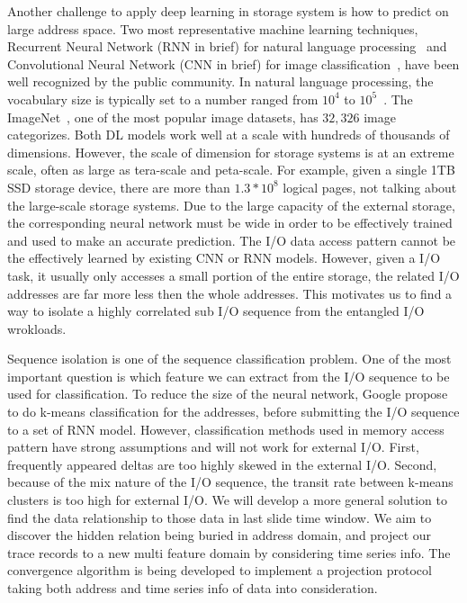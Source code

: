 Another challenge to apply deep learning in storage system is how to predict on large address space.
Two most representative machine learning techniques,
Recurrent Neural Network (RNN in brief) for natural language processing~\cite{graves2013generating,cho2014learning,li2015constructing}
and Convolutional Neural Network (CNN in brief) for image classification~\cite{lecun1995convolutional,karpathy2014large,kim2014convolutional,abdel2014convolutional,krizhevsky2012imagenet},
have been well recognized by the public community.
In natural language processing, the vocabulary size is
typically set to a number ranged from $10^4$ to $10^5$~\cite{Britz:2017}.
The ImageNet~\cite{deng2009imagenet}, one of the most popular image datasets, has $32,326$ image categorizes.
Both DL models work well at a scale with hundreds of thousands of dimensions.
However, the scale of dimension for storage systems is at an extreme scale,
often as large as tera-scale and peta-scale.
For example, given a single 1TB SSD storage device,
there are more than $1.3*10^8$ logical pages,
not talking about the large-scale storage systems.
Due to the large capacity of the external storage,
the corresponding neural network must be wide in order to be effectively trained
and used to make an accurate prediction.
The I/O data access pattern cannot be the effectively learned
by existing CNN or RNN models.
However, given a I/O task, it usually only accesses a small portion of the entire storage,
the related I/O addresses are far more less then the whole addresses.
This motivates us to find a way to isolate a highly correlated sub I/O sequence from the entangled I/O wrokloads.

Sequence isolation is one of the sequence classification problem.
One of the most important question is which feature we can extract from the I/O sequence to be used for classification.
To reduce the size of the neural network, Google propose to do k-means classification for the addresses,
before submitting the I/O sequence to a set of RNN model\cite{hashemi2018learning}.
However, classification methods used in memory access pattern have strong assumptions and will not work for external I/O.
First, frequently appeared deltas are too highly skewed in the external I/O.
Second, because of the mix nature of the I/O sequence, the transit rate between k-means clusters is too high for external I/O.
We will develop a more general solution to find the data relationship to those data in last slide time window.
We aim to discover the hidden relation being buried in address domain,
and project our trace records to a new multi feature domain by considering time series info.
The convergence algorithm is being developed to implement a projection protocol
taking both address and time series info of data into consideration.